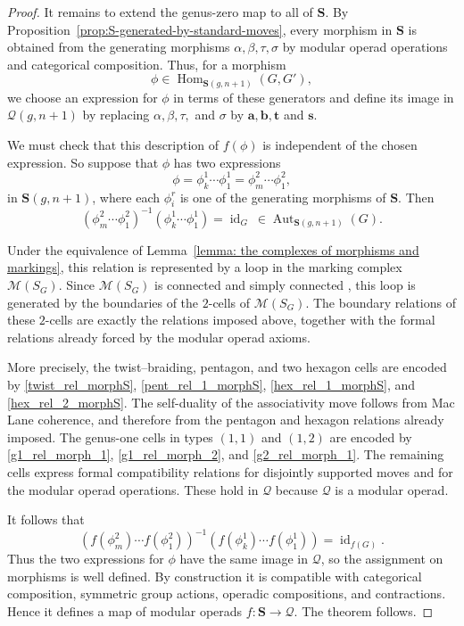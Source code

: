\documentclass{amsart}
\newcommand{\calQ}{\mathcal{Q}}
\newcommand{\bS}{\mathbf{S}}
\newcommand{\calM}{\mathcal{M}}
\newcommand{\id}{\operatorname{id}}
\newcommand{\Hom}{\operatorname{Hom}}
\newcommand{\Aut}{\operatorname{Aut}}
\theoremstyle{definition}
\numberwithin{equation}{section}
\begin{document}
\begin{proof}
\medskip 

It remains to extend the genus-zero map to all of $\bS$. By Proposition~\ref{prop:S-generated-by-standard-moves}, every morphism in $\bS$ is obtained from the generating morphisms $\alpha,\beta,\tau,\sigma$ by modular operad operations and categorical composition. Thus, for a morphism
\[
\phi\in\Hom_{\bS(g,n+1)}(G,G'),
\]
we choose an expression for $\phi$ in terms of these generators and define its image in $\calQ(g,n+1)$ by replacing $\alpha,\beta,\tau,$ and $\sigma$ by $\mathbf{a},\mathbf{b},\mathbf{t}$ and $\mathbf{s}$. 

We must check that this description of $f(\phi)$ is independent of the chosen expression. So suppose that $\phi$ has two expressions
\[
\phi=\phi^1_k\cdots \phi^1_1=\phi^2_m\cdots \phi^2_1,
\]
in $\bS(g,n+1)$, where each $\phi^r_i$ is one of the generating morphisms of $\bS$. Then
\[
(\phi^2_m\cdots \phi^2_1)^{-1}(\phi^1_k\cdots \phi^1_1)=\id_G \ \in\Aut_{\bS(g,n+1)}(G).
\]

Under the equivalence of Lemma~\ref{lemma: the complexes of morphisms and markings}, this relation is represented by a loop in the marking complex $\calM(S_G)$. Since $\calM(S_G)$ is connected and simply connected \cite[Theorem~5.1]{bk_marked_surfaces}, this loop is generated by the boundaries of the $2$-cells of $\calM(S_G)$.  The boundary relations of these $2$-cells are exactly the relations imposed above, together with the formal relations already forced by the modular operad axioms. 

More precisely, the twist--braiding, pentagon, and two hexagon cells are encoded by \eqref{twist_rel_morphS}, \eqref{pent_rel_1_morphS}, \eqref{hex_rel_1_morphS}, and \eqref{hex_rel_2_morphS}. The self-duality of the associativity move follows from Mac Lane coherence, and therefore from the pentagon and hexagon relations already imposed.  The genus-one cells in types $(1,1)$ and $(1,2)$ are encoded by \eqref{g1_rel_morph_1}, \eqref{g1_rel_morph_2}, and \eqref{g2_rel_morph_1}. The remaining cells express formal compatibility relations for disjointly supported moves and for the modular operad operations. These hold in $\calQ$ because $\calQ$ is a modular operad. 

It follows that
\[
(f(\phi^2_m)\cdots f(\phi^2_1))^{-1} (f(\phi^1_k)\cdots f(\phi^1_1)) = \id_{f(G)}.
\]
Thus the two expressions for $\phi$ have the same image in $\calQ$, so the assignment on morphisms is well defined. By construction it is compatible with categorical composition, symmetric group actions, operadic compositions, and contractions. Hence it defines a map of modular operads $f:\bS\longrightarrow \calQ.$ The theorem follows. 

\end{proof}
\end{document}
